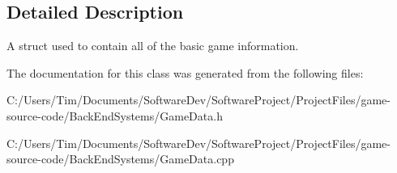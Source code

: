 \subsection{Detailed Description}
A struct used to contain all of the basic game information. 

The documentation for this class was generated from the following files\+:\begin{DoxyCompactItemize}
\item 
C\+:/\+Users/\+Tim/\+Documents/\+Software\+Dev/\+Software\+Project/\+Project\+Files/game-\/source-\/code/\+Back\+End\+Systems/Game\+Data.\+h\item 
C\+:/\+Users/\+Tim/\+Documents/\+Software\+Dev/\+Software\+Project/\+Project\+Files/game-\/source-\/code/\+Back\+End\+Systems/Game\+Data.\+cpp\end{DoxyCompactItemize}
